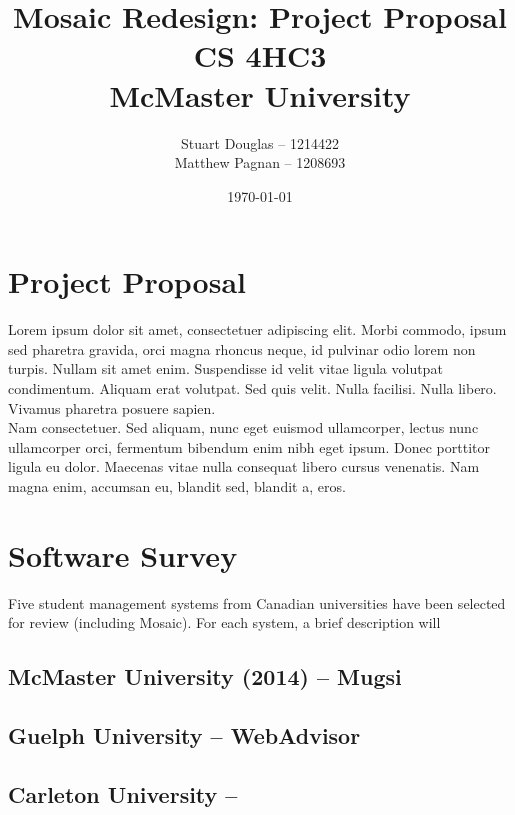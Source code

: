 \documentclass[11pt]{article}
\title{
\LARGE Mosaic Redesign: Project Proposal
\\\vspace{10mm}
\large CS 4HC3\\
McMaster University
\vspace{40mm}
}
\author{
Stuart Douglas -- 1214422
\\Matthew Pagnan -- 1208693
\vspace{10mm}
}
\date{\vfill \today}
\begin{document}
\maketitle
\newpage
{}

\section*{Project Proposal}
Lorem ipsum dolor sit amet, consectetuer adipiscing elit. Morbi commodo, ipsum sed pharetra gravida, orci magna rhoncus neque, id pulvinar odio lorem non turpis. Nullam sit amet enim. Suspendisse id velit vitae ligula volutpat condimentum. Aliquam erat volutpat. Sed quis velit. Nulla facilisi. Nulla libero. Vivamus pharetra posuere sapien.\\

Nam consectetuer. Sed aliquam, nunc eget euismod ullamcorper, lectus nunc ullamcorper orci, fermentum bibendum enim nibh eget ipsum. Donec porttitor ligula eu dolor. Maecenas vitae nulla consequat libero cursus venenatis. Nam magna enim, accumsan eu, blandit sed, blandit a, eros. 

\section*{Software Survey}
Five student management systems from Canadian universities have been selected for review (including Mosaic). For each system, a brief description will 

\subsection*{McMaster University (2014) -- Mugsi}

\subsection*{Guelph University -- WebAdvisor}

\subsection*{Carleton University -- }
\end{document}
